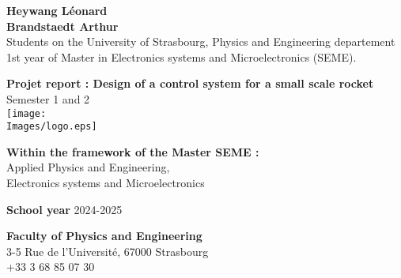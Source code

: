\begin{titlepage}
	\raggedright
	\textbf{Heywang Léonard}	\\
	\textbf{Brandstaedt Arthur}  \\
	Students on the University of Strasbourg, Physics and Engineering departement\\
	1st year of Master in Electronics systems and Microelectronics (SEME).

	\raggedleft

	\centering
	\vspace{3cm}

	\huge
	\textbf{Projet report : Design of a control system for a small scale rocket}\\
	Semester 1 and 2\\
	\vspace{0.5cm}
	\texttt{[image: \\Images/logo.eps]}

	\raggedright
	\normalsize
	\vspace{3cm}
	\textbf{Within the framework of the Master SEME :}\\
	Applied Physics and Engineering, \\
	Electronics systems and Microelectronics

	\vspace{1.5cm}
	\textbf{School year} 2024-2025

	\vspace{1.5cm}
	\textbf{Faculty of Physics and Engineering}\\
	3-5 Rue de l'Université, 67000 Strasbourg\\
	+33 3 68 85 07 30

	\vspace{1 cm}
	\centering
	\begin{figure}[!ht]%
		\centering
		\qquad
	\end{figure}
\end{titlepage}
